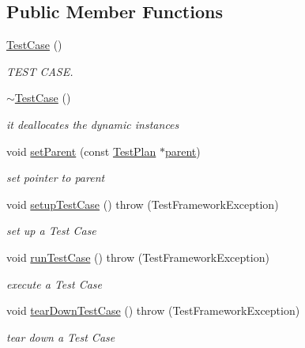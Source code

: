 \subsection*{Public Member Functions}
\begin{DoxyCompactItemize}
\item 
\hyperlink{classit_1_1testbench_1_1data_1_1TestCase_a222ecfeaeee5f64e2a3d952edb6e202a}{Test\-Case} ()
\begin{DoxyCompactList}\small\item\em T\-E\-S\-T C\-A\-S\-E. \end{DoxyCompactList}\item 
\hyperlink{classit_1_1testbench_1_1data_1_1TestCase_ac42069475cd5c89c492f355af7adb05f}{$\sim$\-Test\-Case} ()
\begin{DoxyCompactList}\small\item\em it deallocates the dynamic instances \end{DoxyCompactList}\item 
void \hyperlink{classit_1_1testbench_1_1data_1_1TestCase_aef165620fc621f6b7ed00bd9a36881f2}{set\-Parent} (const \hyperlink{classit_1_1testbench_1_1data_1_1TestPlan}{Test\-Plan} $\ast$\hyperlink{classit_1_1testbench_1_1data_1_1TestCase_a80afa358e2299772f9fbe5e788789280}{parent})
\begin{DoxyCompactList}\small\item\em set pointer to parent \end{DoxyCompactList}\item 
void \hyperlink{classit_1_1testbench_1_1data_1_1TestCase_a67373edb7eb1be62b27d5a90b570261e}{setup\-Test\-Case} ()  throw (\-Test\-Framework\-Exception)
\begin{DoxyCompactList}\small\item\em set up a Test Case \end{DoxyCompactList}\item 
void \hyperlink{classit_1_1testbench_1_1data_1_1TestCase_ac78ae6e5a0cfaac6e9be4212be017cb7}{run\-Test\-Case} ()  throw (\-Test\-Framework\-Exception)
\begin{DoxyCompactList}\small\item\em execute a Test Case \end{DoxyCompactList}\item 
void \hyperlink{classit_1_1testbench_1_1data_1_1TestCase_a5f13e6419d7bb60c257d0a40097901aa}{tear\-Down\-Test\-Case} ()  throw (\-Test\-Framework\-Exception)
\begin{DoxyCompactList}\small\item\em tear down a Test Case \end{DoxyCompactList}\item 

\end{DoxyCompactItemize}

